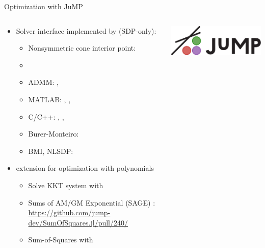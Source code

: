 \documentclass{beamer}
\begin{document}
\begin{frame}{Optimization with JuMP}
    \begin{columns}
    \begin{column}{0.9\textwidth}
    \begin{itemize}
        \item Solver interface  implemented by (SDP-only):
        \begin{itemize}
            \item Nonsymmetric cone interior point: 
            \item {}
            \item ADMM: , 
            \item MATLAB: , , 
            \item C/C++: , , 
            \item Burer-Monteiro: 
            \item BMI, NLSDP: 
        \end{itemize}
        \item {} extension for optimization with polynomials 
          \begin{itemize}
            \item Solve KKT system with 
            \item Sums of AM/GM Exponential (SAGE) : \url{https://github.com/jump-dev/SumOfSquares.jl/pull/240/}
            \item Sum-of-Squares with 
          \end{itemize}
    \end{itemize}
    \end{column}
    \begin{column}{0.1\textwidth}
    \includegraphics[scale=0.11]{JuMP.png}
    \end{column}
    \end{columns}
\end{frame}
\end{document}
